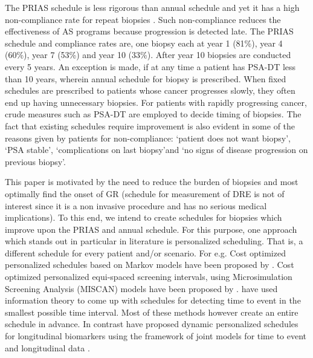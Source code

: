 The PRIAS schedule is less rigorous than annual schedule and yet it has a high non-compliance rate for repeat biopsies \citet{bokhorst2015compliance}. Such non-compliance reduces the effectiveness of AS programs because progression is detected late. The PRIAS schedule and compliance rates are, one biopsy each at year 1 (81\%), year 4 (60\%), year 7 (53\%) and year 10 (33\%). After year 10 biopsies are conducted every 5 years. An exception is made, if at any time a patient has PSA-DT less than 10 years, wherein annual schedule for biopsy is prescribed. When fixed schedules are prescribed to  patients whose cancer progresses slowly, they often end up having unnecessary biopsies. For patients with rapidly progressing cancer, crude measures such as PSA-DT are employed to decide timing of biopsies. The fact that existing schedules require improvement is also evident in some of the reasons given by patients for non-compliance: \textquoteleft patient does not want biopsy\textquoteright, \textquoteleft PSA stable\textquoteright, \textquoteleft complications on last biopsy\textquoteright and \textquoteleft no signs of disease progression on previous biopsy\textquoteright.

This paper is motivated by the need to reduce the burden of biopsies and most optimally find the onset of GR (schedule for measurement of DRE is not of interest since it is a non invasive procedure and has no serious medical implications). To this end, we intend to create schedules for biopsies which improve upon the PRIAS and annual schedule. For this purpose, one approach which stands out in particular in literature is personalized scheduling. That is, a different schedule for every patient and/or scenario. For e.g. Cost optimized personalized schedules based on Markov models have been proposed by \citet{bebu2017OptimalScreening}. Cost optimized personalized equi-spaced screening intervals, using Microsimulation Screening Analysis (MISCAN) models have been proposed by \citet{oMahonyOptimaInterval}. \citet{parmigiani1998designing} have used information theory to come up with schedules for detecting time to event in the smallest possible time interval. Most of these methods however create an entire schedule in advance. In contrast \citet{drizopoulosPersScreening} have proposed dynamic personalized schedules for longitudinal biomarkers using the framework of joint models for time to event and longitudinal data \citep{tsiatis2004joint,rizopoulos2012joint}.

